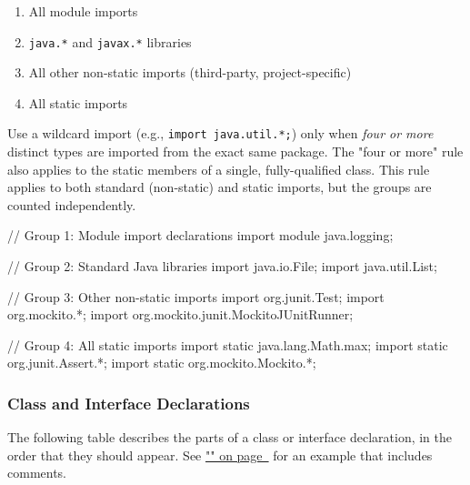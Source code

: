 \documentclass{article}
\begin{document}
\begin{enumerate}
\item All module imports
\item \texttt{java.*} and \texttt{javax.*} libraries
\item All other non-static imports (third-party, project-specific)
\item All static imports
\end{enumerate}

Use a wildcard import (e.g., \texttt{import java.util.*;}) only when \emph{four or more} distinct
types are imported from the exact same package. The "four or more" rule also applies to the static
members of a single, fully-qualified class. This rule applies to both standard (non-static) and
static imports, but the groups are counted independently.

\begin{snippet}
// Group 1: Module import declarations
import module java.logging;

// Group 2: Standard Java libraries
import java.io.File;
import java.util.List;

// Group 3: Other non-static imports
import org.junit.Test;
import org.mockito.*;
import org.mockito.junit.MockitoJUnitRunner;

// Group 4: All static imports
import static java.lang.Math.max;
import static org.junit.Assert.*;
import static org.mockito.Mockito.*;
\end{snippet}

\subsubsection{Class and Interface Declarations}
\label{classesinterfaces}

The following table describes the parts of a class or interface declaration, in the order that they
should appear. See \hyperref[codeexample]{"" on page~\pageref*{codeexample}}
for an example that includes comments.
\end{document}
